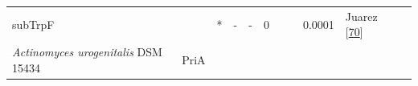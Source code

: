 \documentclass[12pt,twoside]{reedthesis}
\begin{document}
\begin{longtable}[]{@{}lllllllllll@{}}
\begin{minipage}[t]{0.05\columnwidth}
  subTrpF\strut
  \end{minipage} & \begin{minipage}[t]{0.04\columnwidth}\raggedright\strut
  \strut
  \end{minipage} & \begin{minipage}[t]{0.04\columnwidth}\raggedright\strut
  *\strut
  \end{minipage} & \begin{minipage}[t]{0.06\columnwidth}\raggedright\strut
  -\strut
  \end{minipage} & \begin{minipage}[t]{0.06\columnwidth}\raggedright\strut
  -\strut
  \end{minipage} & \begin{minipage}[t]{0.06\columnwidth}\raggedright\strut
  0\strut
  \end{minipage} & \begin{minipage}[t]{0.05\columnwidth}\raggedright\strut
  \strut
  \end{minipage} & \begin{minipage}[t]{0.05\columnwidth}\raggedright\strut
  \strut
  \end{minipage} & \begin{minipage}[t]{0.03\columnwidth}\raggedright\strut
  0.0001\strut
  \end{minipage} & \begin{minipage}[t]{0.11\columnwidth}\raggedright\strut
  Juarez
  {[}\protect\hyperlink{ref-juarez-vazquez_evolution_2017}{70}{]}\strut
  \end{minipage}\tabularnewline
  \begin{minipage}[t]{0.15\columnwidth}\raggedright\strut
  \emph{Actinomyces urogenitalis} DSM 15434\strut
  \end{minipage} & \begin{minipage}[t]{0.05\columnwidth}\raggedright\strut
  PriA\strut
  \end{minipage} & \begin{minipage}[t]{0.04\columnwidth}\raggedright\strut
  \strut
  \end{minipage} & \begin{minipage}[t]{0.04\columnwidth}\raggedright\strut
  \strut
  \end{minipage} & \begin{minipage}[t]{0.06\columnwidth}\raggedright\strut
  \strut
  \end{minipage} & \begin{minipage}[t]{0.06\columnwidth}\raggedright\strut

\end{minipage}
\end{longtable}
\end{document}
